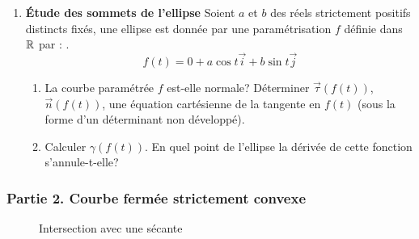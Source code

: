 \begin{enumerate}
\item \textbf{\'Etude des sommets de l'ellipse}\newline
Soient $a$ et $b$ des réels strictement positifs distincts fixés, une ellipse est donnée par une paramétrisation $f$ définie dans $\mathbb{R}$ par :
.\begin{displaymath}
 f(t)=0+a\cos t\overrightarrow i + b\sin t\overrightarrow j
\end{displaymath}
\begin{enumerate}
 \item La courbe paramétrée $f$ est-elle normale? Déterminer $\overrightarrow \tau (f(t))$, $\overrightarrow n (f(t))$, une équation cartésienne de la tangente en $f(t)$ (sous la forme d'un déterminant non développé).
\item Calculer $\gamma(f(t))$. En quel point de l'ellipse la dérivée de cette fonction s'annule-t-elle?
\end{enumerate}
\end{enumerate}
\subsubsection*{Partie 2. Courbe fermée strictement convexe}
\begin{figure}[ht]
 \centering
 
 \caption{Intersection avec une sécante}
 \label{fig:Esommets_2}
\end{figure}

